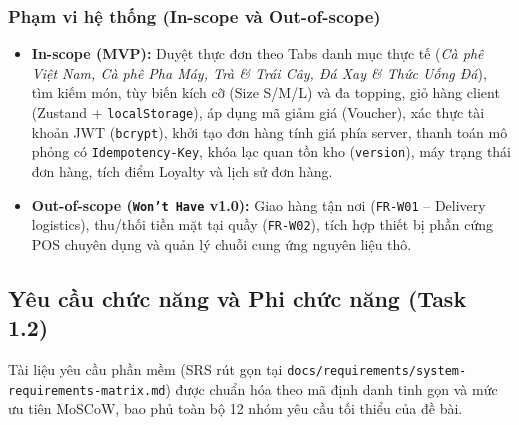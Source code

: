 \documentclass[a4paper,12pt]{article}
\begin{document}
\subsubsection{Phạm vi hệ thống (In-scope và Out-of-scope)}
\begin{itemize}
  \item \textbf{In-scope (MVP):} Duyệt thực đơn theo Tabs danh mục thực tế (\textit{Cà phê Việt Nam, Cà phê Pha Máy, Trà \& Trái Cây, Đá Xay \& Thức Uống Đá}), tìm kiếm món, tùy biến kích cỡ (Size S/M/L) và đa topping, giỏ hàng client (Zustand + \texttt{localStorage}), áp dụng mã giảm giá (Voucher), xác thực tài khoản JWT (\texttt{bcrypt}), khởi tạo đơn hàng tính giá phía server, thanh toán mô phỏng có \texttt{Idempotency-Key}, khóa lạc quan tồn kho (\texttt{version}), máy trạng thái đơn hàng, tích điểm Loyalty và lịch sử đơn hàng.
  \item \textbf{Out-of-scope (\texttt{Won't Have} v1.0):} Giao hàng tận nơi (\texttt{FR-W01} -- Delivery logistics), thu/thối tiền mặt tại quầy (\texttt{FR-W02}), tích hợp thiết bị phần cứng POS chuyên dụng và quản lý chuỗi cung ứng nguyên liệu thô.
\end{itemize}

\subsection{Yêu cầu chức năng và Phi chức năng (Task 1.2)}
Tài liệu yêu cầu phần mềm (SRS rút gọn tại \texttt{docs/requirements/system-requirements-matrix.md}) được chuẩn hóa theo mã định danh tinh gọn và mức ưu tiên MoSCoW, bao phủ toàn bộ 12 nhóm yêu cầu tối thiểu của đề bài.
\end{document}
